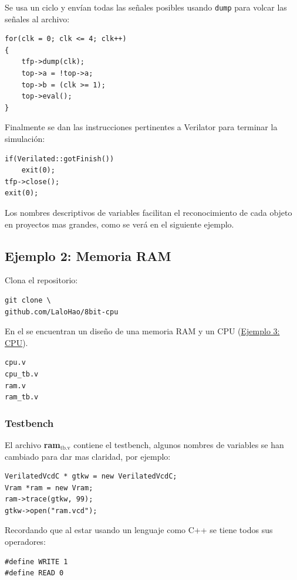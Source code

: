 \documentclass[11pt]{/home/hao/dev/org/latex-plantilla/IEEEtran}
\begin{document}
Se usa un ciclo y envían todas las señales posibles usando
\texttt{dump} para volcar las señales al archivo:

\begin{verbatim}
for(clk = 0; clk <= 4; clk++)
{
    tfp->dump(clk);
    top->a = !top->a;
    top->b = (clk >= 1);
    top->eval();
}
\end{verbatim}

Finalmente se dan las instrucciones pertinentes a Verilator para
terminar la simulación:

\begin{verbatim}
if(Verilated::gotFinish())
    exit(0);
tfp->close();
exit(0);
\end{verbatim}

Los nombres descriptivos de variables facilitan el reconocimiento
de cada objeto en proyectos mas grandes, como se verá en el
siguiente ejemplo.
\subsection{Ejemplo 2: Memoria RAM}
\label{sec:orgc6cafb4}

Clona el repositorio:

\begin{verbatim}
git clone \
github.com/LaloHao/8bit-cpu
\end{verbatim}

En el se encuentran un diseño de una memoria RAM y un CPU (\hyperref[sec:org105a531]{Ejemplo 3: CPU}).

\begin{verbatim}
cpu.v
cpu_tb.v
ram.v
ram_tb.v
\end{verbatim}
\subsubsection{Testbench}
\label{sec:orgdfb1dce}
El archivo \textbf{ram\(_{\text{tb.v}}\)} contiene el testbench, algunos nombres de
variables se han cambiado para dar mas claridad, por ejemplo:

\begin{verbatim}
VerilatedVcdC * gtkw = new VerilatedVcdC;
Vram *ram = new Vram;
ram->trace(gtkw, 99);
gtkw->open("ram.vcd");
\end{verbatim}

Recordando que al estar usando un lenguaje como C++ se tiene todos
sus operadores:

\begin{verbatim}
#define WRITE 1
#define READ 0
\end{verbatim}
\end{document}
